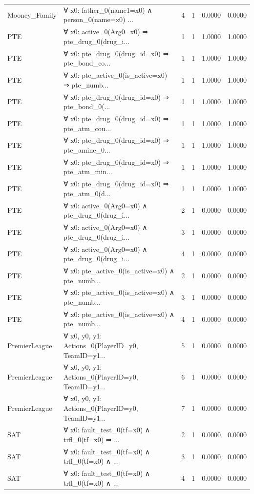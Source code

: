 \documentclass[11pt,a4paper]{article}
\begin{document}
\begin{table}[h!]
\begin{longtable}{|l|p{6cm}|c|c|c|c|}
Mooney_Family & ∀ x0: father\_0(name1=x0) ∧ person\_0(name=x0) ... & 4 & 1 & 0.0000 & 0.0000 \\
PTE & ∀ x0: active\_0(Arg0=x0) ⇒ pte\_drug\_0(drug\_i... & 1 & 1 & 1.0000 & 1.0000 \\
PTE & ∀ x0: pte\_drug\_0(drug\_id=x0) ⇒ pte\_bond\_co... & 1 & 1 & 1.0000 & 1.0000 \\
PTE & ∀ x0: pte\_active\_0(is\_active=x0) ⇒ pte\_numb... & 1 & 1 & 1.0000 & 1.0000 \\
PTE & ∀ x0: pte\_drug\_0(drug\_id=x0) ⇒ pte\_bond\_0(... & 1 & 1 & 1.0000 & 1.0000 \\
PTE & ∀ x0: pte\_drug\_0(drug\_id=x0) ⇒ pte\_atm\_cou... & 1 & 1 & 1.0000 & 1.0000 \\
PTE & ∀ x0: pte\_drug\_0(drug\_id=x0) ⇒ pte\_amine\_0... & 1 & 1 & 1.0000 & 1.0000 \\
PTE & ∀ x0: pte\_drug\_0(drug\_id=x0) ⇒ pte\_atm\_min... & 1 & 1 & 1.0000 & 1.0000 \\
PTE & ∀ x0: pte\_drug\_0(drug\_id=x0) ⇒ pte\_atm\_0(d... & 1 & 1 & 1.0000 & 1.0000 \\
PTE & ∀ x0: active\_0(Arg0=x0) ∧ pte\_drug\_0(drug\_i... & 2 & 1 & 0.0000 & 0.0000 \\
PTE & ∀ x0: active\_0(Arg0=x0) ∧ pte\_drug\_0(drug\_i... & 3 & 1 & 0.0000 & 0.0000 \\
PTE & ∀ x0: active\_0(Arg0=x0) ∧ pte\_drug\_0(drug\_i... & 4 & 1 & 0.0000 & 0.0000 \\
PTE & ∀ x0: pte\_active\_0(is\_active=x0) ∧ pte\_numb... & 2 & 1 & 0.0000 & 0.0000 \\
PTE & ∀ x0: pte\_active\_0(is\_active=x0) ∧ pte\_numb... & 3 & 1 & 0.0000 & 0.0000 \\
PTE & ∀ x0: pte\_active\_0(is\_active=x0) ∧ pte\_numb... & 4 & 1 & 0.0000 & 0.0000 \\
PremierLeague & ∀ x0, y0, y1: Actions\_0(PlayerID=y0, TeamID=y1... & 5 & 1 & 0.0000 & 0.0000 \\
PremierLeague & ∀ x0, y0, y1: Actions\_0(PlayerID=y0, TeamID=y1... & 6 & 1 & 0.0000 & 0.0000 \\
PremierLeague & ∀ x0, y0, y1: Actions\_0(PlayerID=y0, TeamID=y1... & 7 & 1 & 0.0000 & 0.0000 \\
SAT & ∀ x0: fault\_test\_0(tf=x0) ∧ trfl\_0(tf=x0) ⇒ ... & 2 & 1 & 0.0000 & 0.0000 \\
SAT & ∀ x0: fault\_test\_0(tf=x0) ∧ trfl\_0(tf=x0) ∧ ... & 3 & 1 & 0.0000 & 0.0000 \\
SAT & ∀ x0: fault\_test\_0(tf=x0) ∧ trfl\_0(tf=x0) ∧ ... & 4 & 1 & 0.0000 & 0.0000 \\

\end{longtable}
\end{table}
\end{document}
